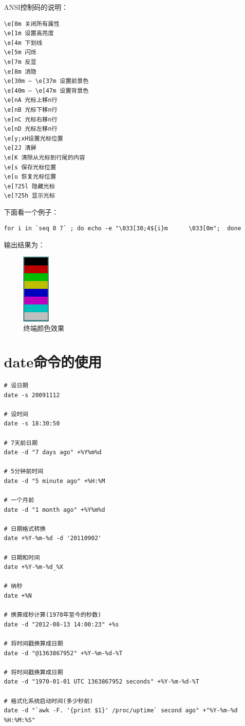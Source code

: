 ANSI控制码的说明：

\small{
\begin{verbatim}
\e[0m 关闭所有属性 
\e[1m 设置高亮度 
\e[4m 下划线 
\e[5m 闪烁 
\e[7m 反显 
\e[8m 消隐 
\e[30m — \e[37m 设置前景色 
\e[40m — \e[47m 设置背景色 
\e[nA 光标上移n行 
\e[nB 光标下移n行 
\e[nC 光标右移n行 
\e[nD 光标左移n行 
\e[y;xH设置光标位置 
\e[2J 清屏 
\e[K 清除从光标到行尾的内容 
\e[s 保存光标位置 
\e[u 恢复光标位置 
\e[?25l 隐藏光标 
\e[?25h 显示光标
\end{verbatim}
}
\normalsize

下面看一个例子：
\begin{verbatim}
for i in `seq 0 7` ; do echo -e "\033[30;4${i}m      \033[0m";  done
\end{verbatim}

输出结果为：
\begin{figure}[htbp]
  \centering
  \includegraphics[width=.15\textwidth]{graph/color.png}
  \caption{终端颜色效果}
  \label{fig:TermColor}
\end{figure}

\section{date命令的使用}
\label{sec:dateCmd}


\small{
\begin{verbatim}
# 设日期
date -s 20091112                     

# 设时间
date -s 18:30:50                     

# 7天前日期
date -d "7 days ago" +%Y%m%d         

# 5分钟前时间
date -d "5 minute ago" +%H:%M        

# 一个月前
date -d "1 month ago" +%Y%m%d        

# 日期格式转换
date +%Y-%m-%d -d '20110902'         

# 日期和时间
date +%Y-%m-%d_%X                    

# 纳秒
date +%N                             

# 换算成秒计算(1970年至今的秒数)
date -d "2012-08-13 14:00:23" +%s    

# 将时间戳换算成日期
date -d "@1363867952" +%Y-%m-%d-%T   

# 将时间戳换算成日期
date -d "1970-01-01 UTC 1363867952 seconds" +%Y-%m-%d-%T  

# 格式化系统启动时间(多少秒前)
date -d "`awk -F. '{print $1}' /proc/uptime` second ago" +"%Y-%m-%d %H:%M:%S"    
\end{verbatim}
}
\normalsize

